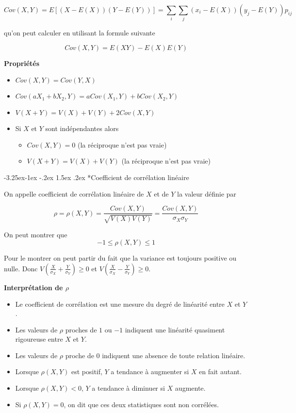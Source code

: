\documentclass[]{book}
\makeatletter
\renewcommand\subsection{\@startsection{subsection}{2}{\z@}%
                                     {-3.25ex\@plus -1ex \@minus -.2ex}%
                                     {1.5ex \@plus .2ex}%
                                     {\normalfont\large\bfseries\color{Violet}}}
\theoremstyle{magentacolor}
\theoremstyle{proprie}
\theoremstyle{exstyle}
\theoremstyle{exostyle}
\theoremstyle{definition}
\theoremstyle{definition}
\theoremstyle{definition}
\theoremstyle{remark}
\makeatother
\begin{document}
\[Cov(X,Y) = E[(X-E(X))(Y-E(Y))] = \sum_i \sum_j (x_i-E(X))(y_j-E(Y)) p_{ij}\]

qu'on peut calculer en utilisant la formule suivante

\[Cov(X,Y) = E(XY) - E(X)E(Y)\]

\textbf{Propriétés}

\begin{itemize}
\item
  \(Cov(X,Y)=Cov(Y,X)\)
\item
  \(Cov(aX_1+bX_2,Y) = a Cov(X_1,Y) + b Cov(X_2,Y)\)
\item
  \(V(X+Y)= V(X) + V(Y) + 2 Cov(X,Y)\)
\item
  Si \(X\) et \(Y\) sont indépendantes alors

  \begin{itemize}
  \item
    \(Cov(X,Y) = 0\) (la réciproque n'est pas vraie)
  \item
    \(V(X+Y) = V(X) + V(Y)\) (la réciproque n'est pas vraie)
  \end{itemize}
\end{itemize}

\hypertarget{coefficient-de-correlation-lineaire}{%
\subsection*{Coefficient de corrélation linéaire}\label{coefficient-de-correlation-lineaire}}

On appelle coefficient de corrélation linéaire de \(X\) et de \(Y\) la
valeur définie par

\[\rho = \rho(X,Y) = \frac{Cov(X,Y)}{\sqrt{V(X)V(Y)}} = \frac{Cov(X,Y)}{\sigma_X \sigma_Y}\]

On peut montrer que \[-1 \leq \rho(X,Y) \leq 1\]

Pour le montrer on peut partir du fait que la variance est toujours
positive ou nulle. Donc
\(V(\frac{X}{\sigma_X} + \frac{Y}{\sigma_Y}) \geq 0\) et
\(V(\frac{X}{\sigma_X} - \frac{Y}{\sigma_Y}) \geq 0\).

\textbf{Interprétation de \(\rho\)}

\begin{itemize}
\item
  Le coefficient de corrélation est une mesure du degré de linéarité
  entre \(X\) et \(Y\).
\item
  Les valeurs de \(\rho\) proches de \(1\) ou \(-1\) indiquent une linéarité
  quasiment rigoureuse entre \(X\) et \(Y\).
\item
  Les valeurs de \(\rho\) proche de 0 indiquent une absence de toute
  relation linéaire.
\item
  Lorsque \(\rho(X,Y)\) est positif, \(Y\) a tendance à augmenter si \(X\)
  en fait autant.
\item
  Lorsque \(\rho(X,Y) < 0\), \(Y\) a tendance à diminuer si \(X\) augmente.
\item
  Si \(\rho(X,Y) =0\), on dit que ces deux statistiques sont non
  corrélées.
\end{itemize}
\end{document}
